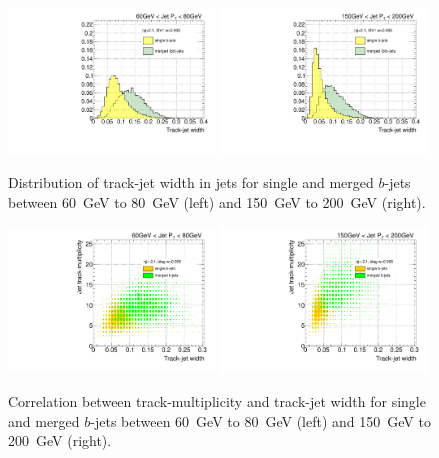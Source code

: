 \begin{figure}[tp]
\centering
\includegraphics[width=0.49\textwidth]{FIGS/VarsSingleMerged/trkWidth060.pdf}
\includegraphics[width=0.49\textwidth]{FIGS/VarsSingleMerged/trkWidth150.pdf}
\caption{Distribution of track-jet width in jets for single and merged $b$-jets between 60~GeV to 80~GeV (left) and 150~GeV to 200~GeV (right).}
\label{fig:trkwidthsinglemerged}
\end{figure}


\begin{figure}[tp]
\centering
\includegraphics[width=0.49\textwidth]{FIGS/VarsSingleMerged/NtrktrkWidth060.pdf}
\includegraphics[width=0.49\textwidth]{FIGS/VarsSingleMerged/NtrktrkWidth150.pdf}
\caption{Correlation between track-multiplicity and track-jet width for single and merged $b$-jets between 60~GeV to 80~GeV (left) and 150~GeV to 200~GeV (right).}
\label{fig:ntrktrkwidthsinglemerged}
\end{figure}



